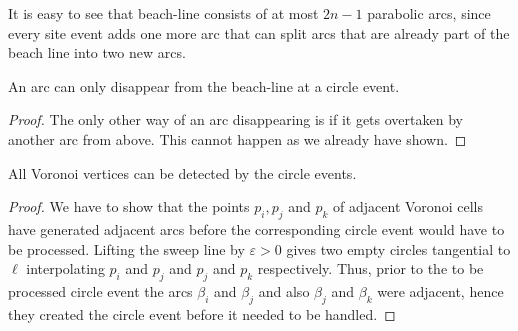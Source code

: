         \begin{remark}
            It is easy to see that beach-line consists of at most $2n - 1$ parabolic arcs, since every site event adds one more arc that can split arcs that are already part of the beach line into two new arcs. 
        \end{remark}

        \begin{lemma} 
            An arc can only disappear from the beach-line at a circle event. 
        \end{lemma}
        \begin{proof} 
            The only other way of an arc disappearing is if it gets overtaken by another arc from above. This cannot happen as we already have shown. 
        \end{proof}

        \begin{lemma} 
            All Voronoi vertices can be detected by the circle events. 
        \end{lemma}
        \begin{proof}
            We have to show that the points $p_i, p_j$ and $p_k$ of adjacent Voronoi cells have generated adjacent arcs before the corresponding circle event would have to be processed. Lifting the sweep line by $\varepsilon > 0$ gives two empty circles tangential to $\ell$ interpolating $p_i$ and $p_j$ and $p_j$ and $p_k$ respectively. Thus, prior to the to be processed circle event the arcs $\beta_i$ and $\beta_j$ and also $\beta_j$ and $\beta_k$ were adjacent, hence they created the circle event before it needed to be handled.
        \end{proof}

